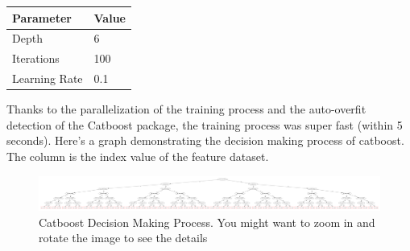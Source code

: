 \documentclass[10pt,letterpaper]{article}
\begin{document}
\begin{table}[H]
\centering
\begin{tabular}{ll}
\textbf{Parameter} & \textbf{Value} \\
\hline
Depth & 6 \\
Iterations & 100 \\
Learning Rate & 0.1 \\
\end{tabular}
\end{table}
Thanks to the parallelization of the training process and the auto-overfit detection of the Catboost package, the training process was super fast (within 5 seconds). Here's a graph demonstrating the decision making process of catboost. The column is the index value of the feature dataset.

\newpage
\begin{figure}[H]
    \centering
    \includegraphics[width=\paperwidth, angle=270]{plots/catboost_tree.pdf}
    \caption{Catboost Decision Making Process. You might want to zoom in and rotate the image to see the details}
    \label{fig:catboost-decision}
\end{figure}
\end{document}

